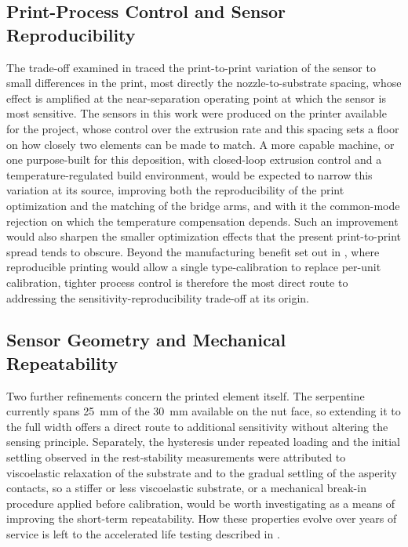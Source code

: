 \subsection{Print-Process Control and Sensor Reproducibility}\label{sec:process_control}
The trade-off examined in  traced the print-to-print variation of the sensor to small differences in the print, most directly the nozzle-to-substrate spacing, whose effect is amplified at the near-separation operating point at which the sensor is most sensitive. The sensors in this work were produced on the printer available for the project, whose control over the extrusion rate and this spacing sets a floor on how closely two elements can be made to match. A more capable machine, or one purpose-built for this deposition, with closed-loop extrusion control and a temperature-regulated build environment, would be expected to narrow this variation at its source, improving both the reproducibility of the print optimization and the matching of the bridge arms, and with it the common-mode rejection on which the temperature compensation depends. Such an improvement would also sharpen the smaller optimization effects that the present print-to-print spread tends to obscure. Beyond the manufacturing benefit set out in , where reproducible printing would allow a single type-calibration to replace per-unit calibration, tighter process control is therefore the most direct route to addressing the sensitivity-reproducibility trade-off at its origin.
 
\subsection{Sensor Geometry and Mechanical Repeatability}
Two further refinements concern the printed element itself. The serpentine currently spans \SI{25}{\milli\meter} of the \SI{30}{\milli\meter} available on the nut face, so extending it to the full width offers a direct route to additional sensitivity without altering the sensing principle. Separately, the hysteresis under repeated loading and the initial settling observed in the rest-stability measurements were attributed to viscoelastic relaxation of the substrate and to the gradual settling of the asperity contacts, so a stiffer or less viscoelastic substrate, or a mechanical break-in procedure applied before calibration, would be worth investigating as a means of improving the short-term repeatability. How these properties evolve over years of service is left to the accelerated life testing described in .

